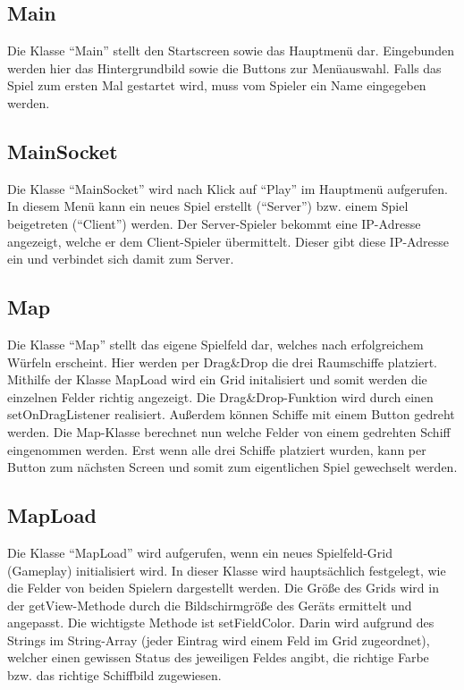 \documentclass[11pt]{article} %
\begin{document}
\subsection{Main}
Die Klasse \enquote{Main} stellt den Startscreen sowie das Hauptmenü dar. Eingebunden werden hier das Hintergrundbild sowie die Buttons zur Menüauswahl. Falls das Spiel zum ersten Mal gestartet wird, muss vom Spieler ein Name eingegeben werden.

\subsection{MainSocket}
Die Klasse \enquote{MainSocket} wird nach Klick auf \enquote{Play} im Hauptmenü aufgerufen. In diesem Menü kann ein neues Spiel erstellt (\enquote{Server}) bzw. einem Spiel beigetreten (\enquote{Client}) werden.
Der Server-Spieler bekommt eine IP-Adresse angezeigt, welche er dem Client-Spieler übermittelt. Dieser gibt diese IP-Adresse ein und verbindet sich damit zum Server.

\subsection{Map}
Die Klasse \enquote{Map} stellt das eigene Spielfeld dar, welches nach erfolgreichem Würfeln erscheint. Hier werden per Drag\&Drop die drei Raumschiffe platziert. Mithilfe der Klasse MapLoad wird ein Grid initalisiert und somit werden die einzelnen Felder richtig angezeigt. 
Die Drag\&Drop-Funktion wird durch einen setOnDragListener realisiert. Außerdem können Schiffe mit einem Button gedreht werden. Die Map-Klasse berechnet nun welche Felder von einem gedrehten Schiff eingenommen werden.
Erst wenn alle drei Schiffe platziert wurden, kann per Button zum nächsten Screen und somit zum eigentlichen Spiel gewechselt werden.

\subsection{MapLoad}
Die Klasse \enquote{MapLoad} wird aufgerufen, wenn ein neues Spielfeld-Grid (Gameplay) initialisiert wird. In dieser Klasse wird hauptsächlich festgelegt, wie die Felder von beiden Spielern dargestellt werden. Die Größe des Grids wird in der getView-Methode durch die Bildschirmgröße des Geräts ermittelt und angepasst.
Die wichtigste Methode ist setFieldColor. Darin wird aufgrund des Strings im String-Array (jeder Eintrag wird einem Feld im Grid zugeordnet), welcher einen gewissen Status des jeweiligen Feldes angibt, die richtige Farbe bzw. das richtige Schiffbild zugewiesen.
\end{document}
